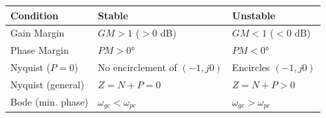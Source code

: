 \documentclass[12pt,a4paper]{article}
\begin{document}
\vspace{5pt}

\begin{tcolorbox}[tikzbox, title={\textbf{Stability Summary}}]
\begin{tabularx}{\linewidth}{|>{\centering\arraybackslash}X|>{\centering\arraybackslash}X|>{\centering\arraybackslash}X|}
\hline
\textbf{\color{myteal}Condition} & \textbf{\color{mygreen}Stable} & \textbf{\color{myred}Unstable} \\
\hline
Gain Margin & $GM > 1$ ($> 0$ dB) & $GM < 1$ ($< 0$ dB) \\
\hline
Phase Margin & $PM > 0°$ & $PM < 0°$ \\
\hline
Nyquist ($P=0$) & No encirclement of $(-1,j0)$ & Encircles $(-1,j0)$ \\
\hline
Nyquist (general) & $Z = N + P = 0$ & $Z = N + P > 0$ \\
\hline
Bode (min. phase) & $\omega_{gc} < \omega_{pc}$ & $\omega_{gc} > \omega_{pc}$ \\
\hline
\end{tabularx}
\end{tcolorbox}
\end{document}
